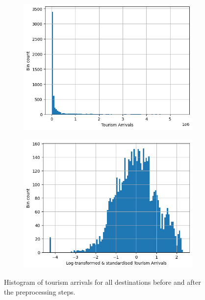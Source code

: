 \documentclass{article}
\begin{document}
\begin{figure}[htbp]
     \centering
     \begin{subfigure}[b]{0.45\textwidth}
         \centering
         \includegraphics[width=\textwidth]{images/target before.png}
     \end{subfigure}
     \begin{subfigure}[b]{0.45\textwidth}
         \centering
         \includegraphics[width=\textwidth]{images/target after.png}
     \end{subfigure}
    \caption{Histogram of tourism arrivals for all destinations before and after the preprocessing steps.}
    \label{fig:preprocess}
\end{figure}
\end{document}
